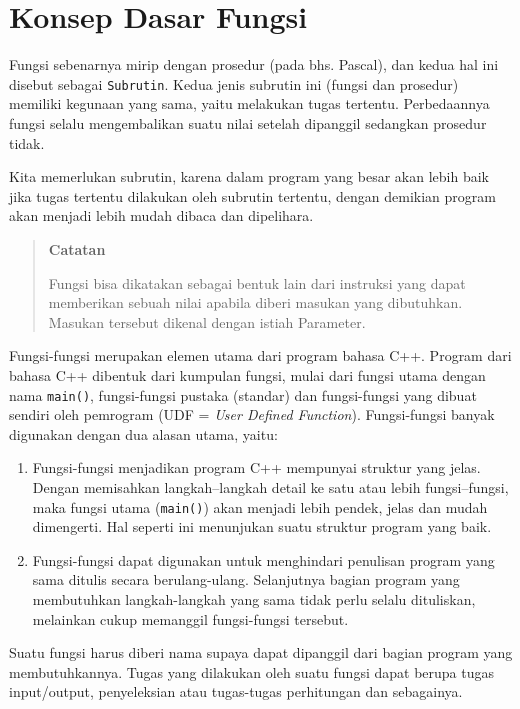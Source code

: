 \section{Konsep Dasar Fungsi}\label{konsep-dasar-fungsi}

Fungsi sebenarnya mirip dengan prosedur (pada bhs. Pascal), dan kedua
hal ini disebut sebagai \texttt{Subrutin}. Kedua jenis subrutin ini
(fungsi dan prosedur) memiliki kegunaan yang sama, yaitu melakukan tugas
tertentu. Perbedaannya fungsi selalu mengembalikan suatu nilai setelah
dipanggil sedangkan prosedur tidak.

Kita memerlukan subrutin, karena dalam program yang besar akan lebih
baik jika tugas tertentu dilakukan oleh subrutin tertentu, dengan
demikian program akan menjadi lebih mudah dibaca dan dipelihara.
\begin{quotation}
 {\LARGE {}} \textbf{Catatan}
	
	Fungsi bisa dikatakan sebagai bentuk
	lain dari instruksi yang dapat memberikan sebuah nilai apabila diberi
	masukan yang dibutuhkan. Masukan tersebut dikenal dengan istiah
	Parameter.
\end{quotation}
 

Fungsi-fungsi merupakan elemen utama dari program bahasa C++. Program
dari bahasa C++ dibentuk dari kumpulan fungsi, mulai dari fungsi utama
dengan nama \texttt{main()}, fungsi-fungsi pustaka (standar) dan
fungsi-fungsi yang dibuat sendiri oleh pemrogram (UDF = \emph{User
Defined Function}). Fungsi-fungsi banyak digunakan dengan dua alasan
utama, yaitu:

\begin{enumerate}

\item
  Fungsi-fungsi menjadikan program C++ mempunyai struktur yang jelas.
  Dengan memisahkan langkah--langkah detail ke satu atau lebih
  fungsi--fungsi, maka fungsi utama (\texttt{main()}) akan menjadi lebih
  pendek, jelas dan mudah dimengerti. Hal seperti ini menunjukan suatu
  struktur program yang baik.
\item
  Fungsi-fungsi dapat digunakan untuk menghindari penulisan program yang
  sama ditulis secara berulang-ulang. Selanjutnya bagian program yang
  membutuhkan langkah-langkah yang sama tidak perlu selalu dituliskan,
  melainkan cukup memanggil fungsi-fungsi tersebut.
\end{enumerate}

Suatu fungsi harus diberi nama supaya dapat dipanggil dari bagian
program yang membutuhkannya. Tugas yang dilakukan oleh suatu fungsi
dapat berupa tugas input/output, penyeleksian atau tugas-tugas
perhitungan dan sebagainya.

